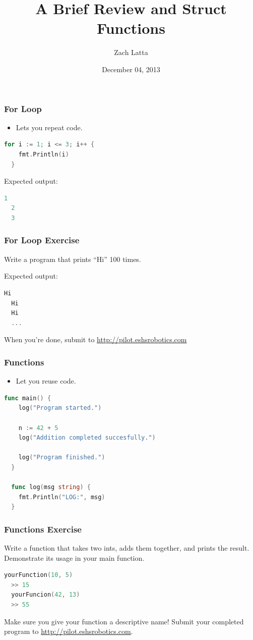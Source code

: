 \documentclass{beamer}
\begin{document}
\title[Review and Struct Functions]{A Brief Review and Struct Functions}
\author[Z. Latta]{Zach Latta}
\date[December 2013]{December 04, 2013}

\frame{\titlepage}

\begin{frame}[fragile]
  \frametitle{For Loop}
  \begin{itemize}
    \item Lets you repeat code.
  \end{itemize}

  \begin{lstlisting}[language=go]
  for i := 1; i <= 3; i++ {
    fmt.Println(i)
  }
  \end{lstlisting}

  Expected output:
  \begin{lstlisting}[language=go]
  1
  2
  3
  \end{lstlisting}
\end{frame}

\begin{frame}[fragile]
  \frametitle{For Loop Exercise}
  Write a program that prints ``Hi'' 100 times.

  Expected output:
  \begin{lstlisting}[language=go]
  Hi
  Hi
  Hi
  ...
  \end{lstlisting}

  When you're done, submit to \url{http://pilot.eshsrobotics.com}
\end{frame}

\begin{frame}[fragile]
  \frametitle{Functions}
  \begin{itemize}
    \item Let you reuse code.
  \end{itemize}

  \begin{lstlisting}[language=go]
  func main() {
    log("Program started.")

    n := 42 + 5
    log("Addition completed succesfully.")

    log("Program finished.")
  }

  func log(msg string) {
    fmt.Println("LOG:", msg)
  }
  \end{lstlisting}
\end{frame}

\begin{frame}[fragile]
  \frametitle{Functions Exercise}
  Write a function that takes two ints, adds them together, and prints the
  result. Demonstrate its usage in your main function.

  \begin{lstlisting}[language=go]
  yourFunction(10, 5)
  >> 15
  yourFuncion(42, 13)
  >> 55
  \end{lstlisting}

  Make sure you give your function a descriptive name! Submit your completed
  program to \url{http://pilot.eshsrobotics.com}.
\end{frame}
\end{document}
